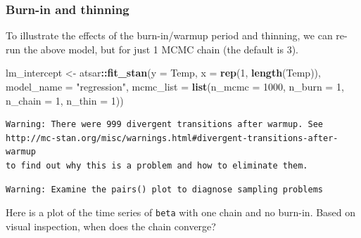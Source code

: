 \documentclass[
]{article}
\newenvironment{Shaded}{\begin{snugshade}}{\end{snugshade}}
\newcommand{\DataTypeTok}[1]{\textcolor[rgb]{0.13,0.29,0.53}{#1}}
\newcommand{\DecValTok}[1]{\textcolor[rgb]{0.00,0.00,0.81}{#1}}
\newcommand{\KeywordTok}[1]{\textcolor[rgb]{0.13,0.29,0.53}{\textbf{#1}}}
\newcommand{\NormalTok}[1]{#1}
\newcommand{\OperatorTok}[1]{\textcolor[rgb]{0.81,0.36,0.00}{\textbf{#1}}}
\newcommand{\StringTok}[1]{\textcolor[rgb]{0.31,0.60,0.02}{#1}}
\begin{document}
\hypertarget{sec-stan-burn}{%
\subsubsection{Burn-in and thinning}\label{sec-stan-burn}}

To illustrate the effects of the burn-in/warmup period and thinning, we
can re-run the above model, but for just 1 MCMC chain (the default is
3).

\begin{Shaded}
\begin{Highlighting}[]
\NormalTok{lm_intercept <-}\StringTok{ }\NormalTok{atsar}\OperatorTok{::}\KeywordTok{fit_stan}\NormalTok{(}\DataTypeTok{y =}\NormalTok{ Temp, }\DataTypeTok{x =} \KeywordTok{rep}\NormalTok{(}\DecValTok{1}\NormalTok{, }\KeywordTok{length}\NormalTok{(Temp)), }
    \DataTypeTok{model_name =} \StringTok{"regression"}\NormalTok{, }\DataTypeTok{mcmc_list =} \KeywordTok{list}\NormalTok{(}\DataTypeTok{n_mcmc =} \DecValTok{1000}\NormalTok{, }
        \DataTypeTok{n_burn =} \DecValTok{1}\NormalTok{, }\DataTypeTok{n_chain =} \DecValTok{1}\NormalTok{, }\DataTypeTok{n_thin =} \DecValTok{1}\NormalTok{))}
\end{Highlighting}
\end{Shaded}

\begin{verbatim}
Warning: There were 999 divergent transitions after warmup. See
http://mc-stan.org/misc/warnings.html#divergent-transitions-after-warmup
to find out why this is a problem and how to eliminate them.
\end{verbatim}

\begin{verbatim}
Warning: Examine the pairs() plot to diagnose sampling problems
\end{verbatim}

Here is a plot of the time series of \texttt{beta} with one chain and no
burn-in. Based on visual inspection, when does the chain converge?

\begin{Shaded}
\end{Shaded}
\end{document}

